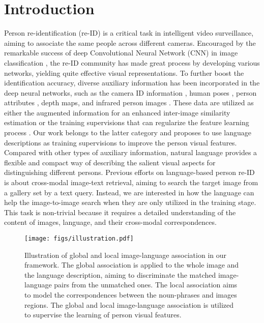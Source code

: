 \documentclass[runningheads]{llncs}
\begin{document}
\section{Introduction}

Person re-identification (re-ID) is a critical task in intelligent video surveillance, aiming to associate the same people across different cameras. Encouraged by the remarkable success of deep Convolutional Neural Network (CNN) in image classification \cite{NIPS2012_Alexnet}, the re-ID community has made great process by developing various networks, yielding quite effective visual representations\cite{ahmed2015improved, varior2016gated, wang2016joint, liu2016spatio, Li_2014_CVPR, Li_Danwei_2017_CVPR, Chen_2017_CVPR, Zhousan_2017_CVPR, liu2017hydraplus, shen2018deep}. To further boost the identification accuracy, diverse auxiliary information has been incorporated in the deep neural networks, such as the camera ID information \cite{Lin2017CVPRcamera}, human poses \cite{zhao2017spindle}, person attributes \cite{su2016deep, attribute_liang}, depth maps\cite{barbosa2012re}, and infrared person images \cite{wu2017rgb}. These data are utilized as either the augmented information for an enhanced inter-image similarity estimation\cite{Lin2017CVPRcamera, zhao2017spindle, wu2017rgb} or the training supervisions that can regularize the feature learning process \cite{su2016deep, attribute_liang}. Our work belongs to the latter category and proposes to use language descriptions as training supervisions to improve the person visual features. Compared with other types of auxiliary information, natural language provides a flexible and compact way of describing the salient visual aspects for distinguishing different persons. Previous efforts on language-based person re-ID \cite{Lishuang_2017_CVPR} is about cross-modal image-text retrieval, aiming to search the target image from a gallery set by a text query. Instead, we are interested in how the language can help the image-to-image search when they are only utilized in the training stage. This task is non-trivial because it requires a detailed understanding of the content of images, language, and their cross-modal correspondences. 
 
 
\begin{figure}[t]
\vspace{-1em}
\centering
\texttt{[image: figs/illustration.pdf]}
\vspace{-1em}
\caption{Illustration of global and local image-language association in our framework. The global association is applied to the whole image and the language description, aiming to discriminate the matched image-language pairs from the unmatched ones. The local association aims to model the correspondences between the noun-phrases and images regions. The global and local image-language association is utilized to supervise the learning of person visual features.}  \label{illustration}
\vspace{-1em}
\end{figure}
\end{document}
